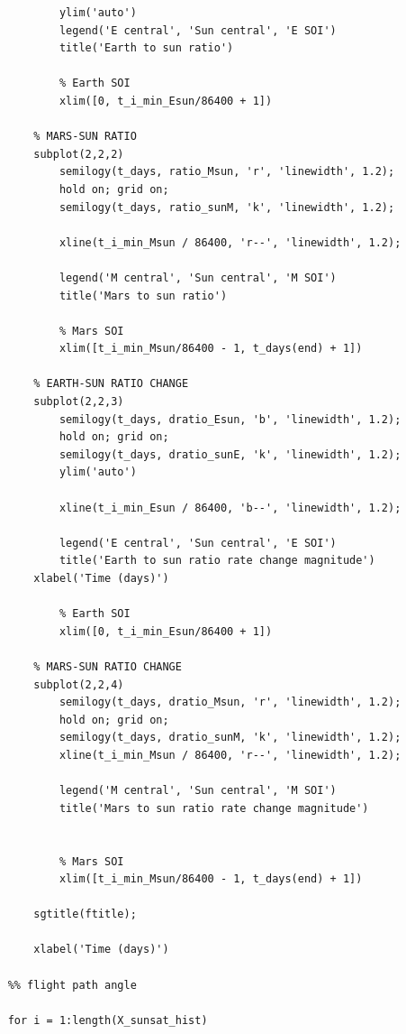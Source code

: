 \documentclass[conf]{new-aiaa}
\begin{document}
\begin{lstlisting}
            ylim('auto') 
            legend('E central', 'Sun central', 'E SOI')
            title('Earth to sun ratio') 
    
            % Earth SOI 
            xlim([0, t_i_min_Esun/86400 + 1])
    
        % MARS-SUN RATIO 
        subplot(2,2,2) 
            semilogy(t_days, ratio_Msun, 'r', 'linewidth', 1.2); 
            hold on; grid on; 
            semilogy(t_days, ratio_sunM, 'k', 'linewidth', 1.2); 
    
            xline(t_i_min_Msun / 86400, 'r--', 'linewidth', 1.2); 
    
            legend('M central', 'Sun central', 'M SOI')
            title('Mars to sun ratio')
            
            % Mars SOI 
            xlim([t_i_min_Msun/86400 - 1, t_days(end) + 1])
            
        % EARTH-SUN RATIO CHANGE 
        subplot(2,2,3) 
            semilogy(t_days, dratio_Esun, 'b', 'linewidth', 1.2); 
            hold on; grid on; 
            semilogy(t_days, dratio_sunE, 'k', 'linewidth', 1.2); 
            ylim('auto') 
            
            xline(t_i_min_Esun / 86400, 'b--', 'linewidth', 1.2); 
            
            legend('E central', 'Sun central', 'E SOI')
            title('Earth to sun ratio rate change magnitude') 
        xlabel('Time (days)') 
    
            % Earth SOI 
            xlim([0, t_i_min_Esun/86400 + 1])
    
        % MARS-SUN RATIO CHANGE 
        subplot(2,2,4) 
            semilogy(t_days, dratio_Msun, 'r', 'linewidth', 1.2); 
            hold on; grid on; 
            semilogy(t_days, dratio_sunM, 'k', 'linewidth', 1.2); 
            xline(t_i_min_Msun / 86400, 'r--', 'linewidth', 1.2); 
            
            legend('M central', 'Sun central', 'M SOI')
            title('Mars to sun ratio rate change magnitude') 
    
    
            % Mars SOI 
            xlim([t_i_min_Msun/86400 - 1, t_days(end) + 1])
            
        sgtitle(ftitle); 
            
        xlabel('Time (days)') 
    
    %% flight path angle 
    
    for i = 1:length(X_sunsat_hist)
        

\end{lstlisting}
\end{document}
